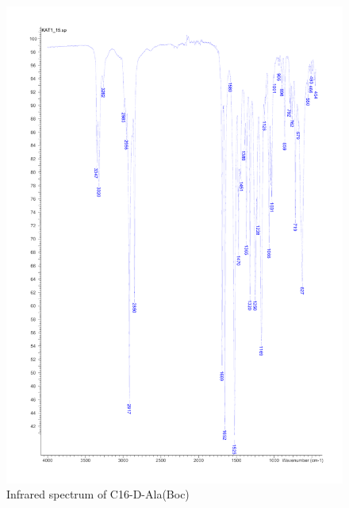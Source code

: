 \begin{figure}[ht!]
\centering
\includegraphics[scale=0.6]{IR/KAT1_15.pdf}
\caption{Infrared spectrum of C16-D-Ala(Boc)}
\end{figure}

